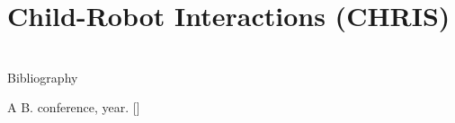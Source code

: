 \documentclass[compress]{beamer}
\begin{document}
\section{Child-Robot Interactions (CHRIS)}

\subsection{}



\section{}



\begin{frame}{Bibliography}
    \begin{thebibliography}{10}

\beamertemplatearticlebibitems
       A B.
      \newblock {}
      \newblock conference, year. [\href{https:// github.com/}{\faGithub}]

    \end{thebibliography}
\end{frame}




\closingtitle


\end{document}
